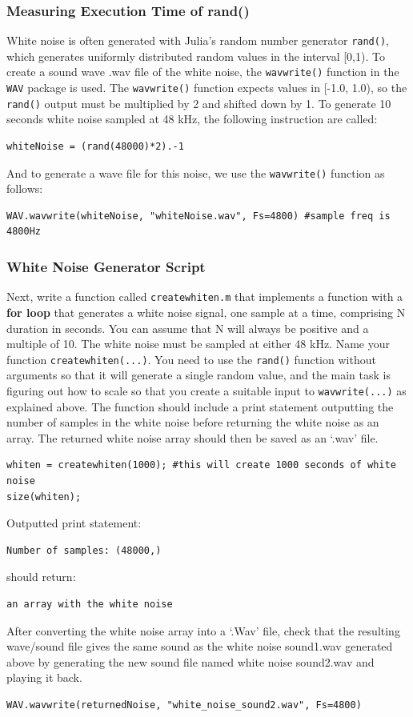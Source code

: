 \subsubsection{Measuring Execution Time of rand()}
White noise is often generated with Julia's random number generator \verb|rand()|, which generates uniformly distributed random values in the interval [0,1). To create a sound wave .wav file of the white noise, the \verb|wavwrite()| function in the \verb|WAV| package is used. The \verb|wavwrite()| function expects values in [-1.0, 1.0), so the \verb|rand()| output must be multiplied by 2 and shifted down by 1. To generate 10 seconds white noise sampled at 48 kHz, the following instruction are called:
\begin{lstlisting}
whiteNoise = (rand(48000)*2).-1
\end{lstlisting}
And to generate a wave file for this noise, we use the \verb|wavwrite()| function as follows:
\begin{lstlisting}
WAV.wavwrite(whiteNoise, "whiteNoise.wav", Fs=4800) #sample freq is 4800Hz
\end{lstlisting}

\subsubsection{White Noise Generator Script}
Next, write a function called \verb|createwhiten.m| that implements a function with a \textbf{for loop} that generates a white noise signal, one sample at a time, comprising N duration in seconds. You can assume that N will always be positive and a multiple of 10. The white noise must be sampled at either 48 kHz. Name your function \verb|createwhiten(...)|. You need to use the \verb|rand()| function without arguments so that it will generate a single random value, and the main task is figuring out how to scale so that you create a suitable input to \verb|wavwrite(...)| as explained above. The function should include a print statement outputting the number of samples in the white noise before returning the white noise as an array. The returned white noise array should then be saved as an `.wav' file.
\begin{lstlisting}
whiten = createwhiten(1000); #this will create 1000 seconds of white noise
size(whiten);
\end{lstlisting}
Outputted print statement:
\begin{lstlisting}
Number of samples: (48000,)
\end{lstlisting}
should return:
\begin{lstlisting}
an array with the white noise
\end{lstlisting}
After converting the white noise array into a `.Wav' file, check that the resulting wave/sound file gives the same sound as the white noise sound1.wav generated above by generating the new sound file named white noise sound2.wav and playing it back.
\begin{lstlisting}
WAV.wavwrite(returnedNoise, "white_noise_sound2.wav", Fs=4800)
\end{lstlisting}



